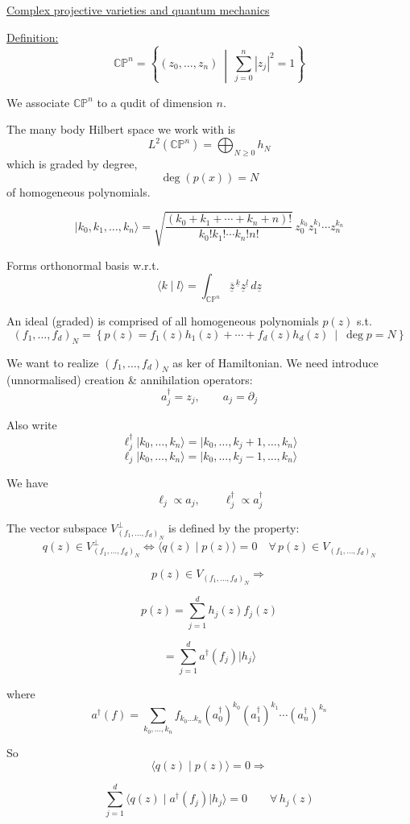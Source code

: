 \underline{Complex projective varieties and quantum mechanics}

\underline{Definition:}\quad
\[
\mathbb{CP}^n=\left\{(z_0,\ldots,z_n)\ \middle|\ \sum_{j=0}^{n}|z_j|^2=1\right\}
\]

We associate $\mathbb{CP}^n$ to a qudit of dimension $n$.

The many body Hilbert space we work with is
\[
L^2(\mathbb{CP}^n)=\bigoplus_{N\geq 0}h_N
\]
which is graded by degree,
\[
\deg(p(x))=N
\]
of homogeneous polynomials.

\[
\lvert k_0,k_1,\ldots,k_n\rangle
=
\sqrt{\frac{(k_0+k_1+\cdots+k_n+n)!}{k_0!k_1!\cdots k_n!n!}}\,
z_0^{k_0}z_1^{k_1}\cdots z_n^{k_n}
\]

Forms orthonormal basis w.r.t.
\[
\langle k\mid l\rangle
=
\int_{\mathbb{CP}^n}\overline{\underline{z}}^{\,\underline{k}}\underline{z}^{\underline{l}}\,d\underline{z}
\]

An ideal (graded) is comprised of all homogeneous polynomials $p(z)$ s.t.
\[
(f_1,\ldots,f_d)_N
=
\left\{
p(z)=f_1(z)h_1(z)+\cdots+f_d(z)h_d(z)
\ \middle|\ 
\deg p=N
\right\}
\]

We want to realize $(f_1,\ldots,f_d)_N$ as ker of Hamiltonian. We need introduce (unnormalised) creation \& annihilation operators:
\[
a_j^\dagger=z_j,\qquad a_j=\partial_j
\]

Also write
\[
\ell_j^\dagger\lvert k_0,\ldots,k_n\rangle
=
\lvert k_0,\ldots,k_j+1,\ldots,k_n\rangle
\]
\[
\ell_j\lvert k_0,\ldots,k_n\rangle
=
\lvert k_0,\ldots,k_j-1,\ldots,k_n\rangle
\]

We have
\[
\ell_j\propto a_j,\qquad \ell_j^\dagger\propto a_j^\dagger
\]

The vector subspace $V_{(f_1,\ldots,f_d)_N}^{\perp}$ is defined by the property:
\[
q(z)\in V_{(f_1,\ldots,f_d)_N}^{\perp}
\Longleftrightarrow
\langle q(z)\mid p(z)\rangle=0
\quad \forall\,p(z)\in V_{(f_1,\ldots,f_d)_N}
\]

\[
p(z)\in V_{(f_1,\ldots,f_d)_N}
\Longrightarrow
\]

\[
p(z)=\sum_{j=1}^{d}h_j(z)f_j(z)
\]

\[
=\sum_{j=1}^{d}a^\dagger(f_j)\lvert h_j\rangle
\]

where
\[
a^\dagger(f)=\sum_{k_0,\ldots,k_n}f_{k_0\ldots k_n}
(a_0^\dagger)^{k_0}(a_1^\dagger)^{k_1}\cdots(a_n^\dagger)^{k_n}
\]

So
\[
\langle q(z)\mid p(z)\rangle=0
\Longrightarrow
\]

\[
\sum_{j=1}^{d}
\langle q(z)\mid a^\dagger(f_j)\lvert h_j\rangle
=0
\qquad \forall\,h_j(z)
\]

